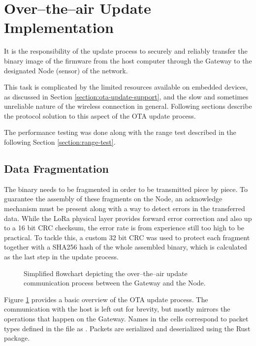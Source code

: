 \section{\label{section:ota-implementation}Over--the--air Update Implementation}
It is the responsibility of the update process to securely and reliably transfer the binary image of the firmware from the host computer through the Gateway to the designated Node (sensor) of the network. 

This task is complicated by the limited resources available on embedded devices, as discussed in Section \ref{section:ota-update-support}, and the slow and sometimes unreliable nature of the wireless connection in general. Following sections describe the protocol solution to this aspect of the OTA update process.

The performance testing was done along with the range test described in the following Section \ref{section:range-test}.

\subsection{Data Fragmentation}
The binary needs to be fragmented in order to be transmitted piece by piece. To guarantee the assembly of these fragments on the Node, an acknowledge mechanism must be present along with a way to detect errors in the transferred data. While the LoRa physical layer provides forward error correction and also up to a 16 bit CRC checksum, the error rate is from experience still too high to be practical. To tackle this, a custom 32 bit CRC was used to protect each fragment together with a SHA256 hash of the whole assembled binary, which is calculated as the last step in the update process.

\begin{figure}[p]
    
    \caption{\label{fig:ota-algo}Simplified flowchart depicting the over--the--air update communication process between the Gateway and the Node.}
\end{figure}

Figure \ref{fig:ota-algo} provides a basic overview of the OTA update process. The communication with the host is left out for brevity, but mostly mirrors the operations that happen on the Gateway. Names in the cells correspond to packet types defined in the  file as . Packets are serialized and deserialized using the  Rust package.

